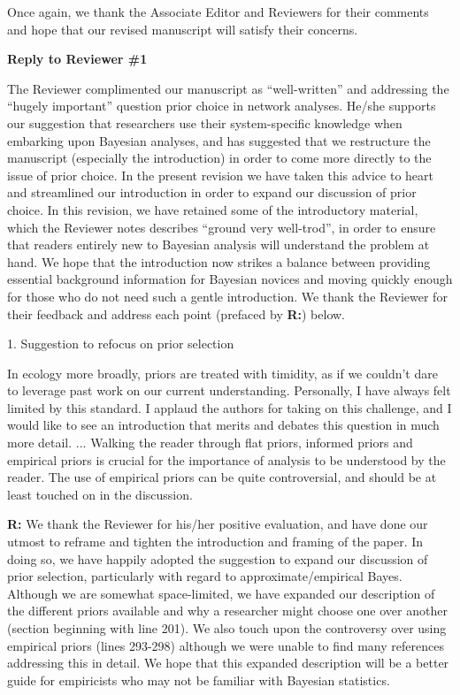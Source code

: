\documentclass[12pt]{letter}
\newenvironment{refquote}{\bigskip \begin{it}}{\end{it}\smallskip}
\begin{document}
	Once again, we thank the Associate Editor and Reviewers for their comments and hope that our revised manuscript will satisfy their concerns.

\newpage


{\Large \bf Reply to Reviewer \#1}


	The Reviewer complimented our manuscript as ``well-written'' and addressing the ``hugely important'' question prior choice in network analyses. He/she supports our suggestion that researchers use their system-specific knowledge when embarking upon Bayesian analyses, and has suggested that we restructure the manuscript (especially the introduction) in order to come more directly to the issue of prior choice. In the present revision we have taken this advice to heart and streamlined our introduction in order to expand our discussion of prior choice. In this revision, we have retained some of the introductory material, which the Reviewer notes describes ``ground very well-trod'', in order to ensure that readers entirely new to Bayesian analysis will understand the problem at hand. We hope that the introduction now strikes a balance between providing essential background information for Bayesian novices and moving quickly enough for those who do not need such a gentle introduction. We thank the Reviewer for their feedback and address each point (prefaced by \textbf{R:}) below.


	1. Suggestion to refocus on prior selection

		\begin{refquote}
			In ecology more broadly, priors are treated with timidity, as if we couldn't dare to leverage past work on our current understanding. Personally, I have always felt limited by this standard. I applaud the authors for taking on this challenge, and I would like to see an introduction that merits and debates this question in much more detail. ... Walking the reader through flat priors, informed priors and empirical priors is crucial for the importance of analysis to be understood by the reader. The use of empirical priors can be quite controversial, and should be at least touched on in the discussion. 
			\end{refquote}


		\textbf{R:} We thank the Reviewer for his/her positive evaluation, and have done our utmost to reframe and tighten the introduction and framing of the paper. In doing so, we have happily adopted the suggestion to expand our discussion of prior selection, particularly with regard to approximate/empirical Bayes. Although we are somewhat space-limited, we have expanded our description of the different priors available and why a researcher might choose one over another (section beginning with line 201). We also touch upon the controversy over using empirical priors (lines 293-298) although we were unable to find many references addressing this in detail. We hope that this expanded description will be a better guide for empiricists who may not be familiar with Bayesian statistics.
\end{document}
